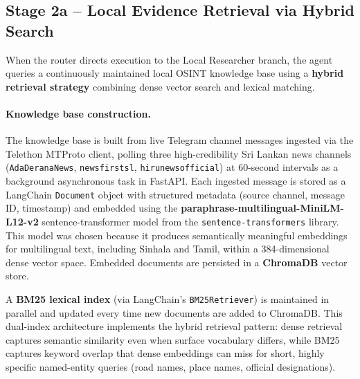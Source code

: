 \documentclass[12pt,a4paper]{article}
\begin{document}
\subsection{Stage 2a -- Local Evidence Retrieval via Hybrid Search}
\label{subsec:local-retrieval}

When the router directs execution to the Local Researcher branch, the agent
queries a continuously maintained local OSINT knowledge base using a
\textbf{hybrid retrieval strategy} combining dense vector search and lexical
matching.

\paragraph{Knowledge base construction.}
The knowledge base is built from live Telegram channel messages ingested via
the Telethon MTProto client, polling three high-credibility Sri Lankan news
channels (\texttt{AdaDeranaNews}, \texttt{newsfirstsl},
\texttt{hirunewsofficial}) at 60-second intervals as a background
asynchronous task in FastAPI. Each ingested message is stored as a LangChain
\texttt{Document} object with structured metadata (source channel, message
ID, timestamp) and embedded using the
\textbf{paraphrase-multilingual-MiniLM-L12-v2} sentence-transformer model
from the \texttt{sentence-transformers} library. This model was chosen
because it produces semantically meaningful embeddings for multilingual text,
including Sinhala and Tamil, within a 384-dimensional dense vector space.
Embedded documents are persisted in a \textbf{ChromaDB} vector store.

A \textbf{BM25 lexical index} (via LangChain's \texttt{BM25Retriever}) is
maintained in parallel and updated every time new documents are added to
ChromaDB. This dual-index architecture implements the hybrid retrieval
pattern: dense retrieval captures semantic similarity even when surface
vocabulary differs, while BM25 captures keyword overlap that dense embeddings
can miss for short, highly specific named-entity queries (road names, place
names, official designations).
\end{document}
